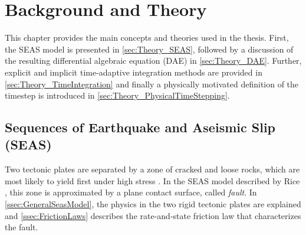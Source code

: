 \chapter{Background and Theory}
\label{chap:BackgroundAndTheory}
This chapter provides the main concepts and theories used in the thesis. First, the SEAS model is presented in \autoref{sec:Theory_SEAS}, followed by a discussion of the resulting differential algebraic equation (DAE) in \autoref{sec:Theory_DAE}. Further, explicit and implicit time-adaptive integration methods are provided in \autoref{sec:Theory_TimeIntegration} and finally a physically motivated definition of the timestep is introduced in \autoref{sec:Theory_PhysicalTimeStepping}.

\section{Sequences of Earthquake and Aseismic Slip (SEAS)}
\label{sec:Theory_SEAS}
Two tectonic plates are separated by a zone of cracked and loose rocks, which are most likely to yield first under high stress \cite{introductionGeophysics}. In the SEAS model described by Rice \cite{GeneralSEASSimulations}, this zone is approximated by a plane contact surface, called \textit{fault}. In \autoref{ssec:GeneralSeasModel}, the physics in the two rigid tectonic plates are explained and \autoref{ssec:FrictionLaws} describes the rate-and-state friction law that characterizes the fault.

